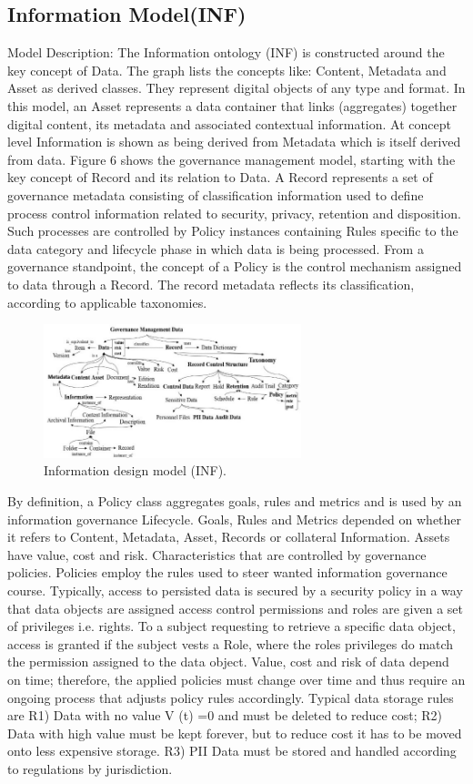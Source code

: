 \subsection{Information Model(INF)}
Model Description: The Information ontology (INF) is constructed around the key concept of Data. The graph lists the concepts like: Content, Metadata and Asset as derived classes. They represent digital objects of any type and format. In this model, an Asset represents a data container that links (aggregates) together digital content, its metadata and associated contextual information. At concept level Information is shown as being derived from Metadata which is itself derived from data. Figure 6 shows the governance management model, starting with the key concept of Record and its relation to Data. A Record represents a set of governance metadata consisting of classification information used to define process control information related to security, privacy, retention and disposition. Such processes are controlled by Policy instances containing Rules specific to the data category and lifecycle phase in which data is being processed. 
From a governance standpoint, the concept of a Policy is the control mechanism assigned to data through a Record. The record metadata reflects its classification, according to applicable taxonomies.
%
\begin{figure}[h]
  \centering
    \includegraphics[width=7.5cm]{images/Fig6-IG.Inf.Model.png}
    \caption{Information design model (INF).}
  \label{fig:infmod}
\end{figure}
By definition, a Policy class aggregates goals, rules and metrics and is used by an information governance Lifecycle. Goals, Rules and Metrics depended on whether it refers to Content, Metadata, Asset, Records or collateral Information. Assets have value, cost and risk. Characteristics that are controlled by governance policies. Policies employ the rules used to steer wanted information governance course. Typically, access to persisted data is secured by a security policy in a way that data objects are assigned access control permissions and roles are given a set of privileges i.e. rights. To a subject requesting to retrieve a specific data object, access is granted if the subject vests a Role, where the roles privileges do match the permission assigned to the data object. 
Value, cost and risk of data depend on time; therefore, the applied policies must change over time and thus require an ongoing process that adjusts policy rules accordingly. Typical data storage rules are R1) Data with no value V (t) =0 and must be deleted to reduce cost; R2) Data with high value must be kept forever, but to reduce cost it has to be moved onto less expensive storage. R3) PII Data must be stored and handled according to regulations by jurisdiction. 
%

